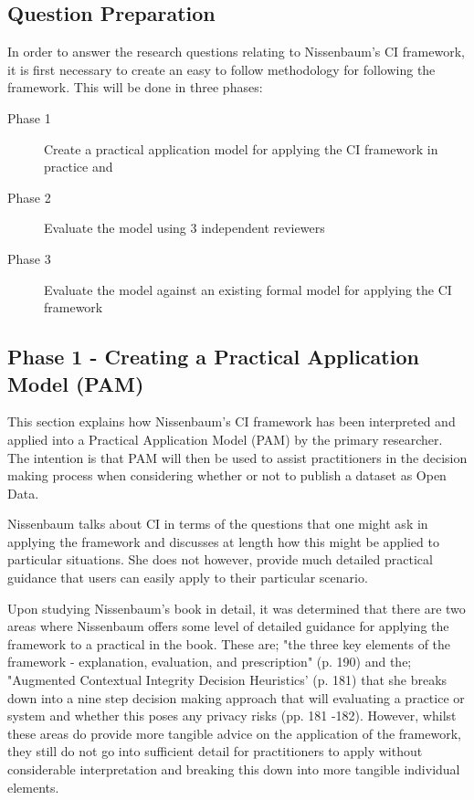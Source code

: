 \subsection {Question Preparation}

In order to answer the research questions relating to Nissenbaum's CI framework, it is first necessary to create an easy to follow methodology for following the framework. This will be done in three phases:  %

\begin{description}

\item [Phase 1] Create a practical application model for applying the CI framework in practice and
\item [Phase 2] Evaluate the model using 3 independent reviewers
\item [Phase 3] Evaluate the model against an existing formal model for applying the CI framework
\end{description}

\subsection{Phase 1 - Creating a Practical Application Model (PAM)} 

This section explains how Nissenbaum's CI framework has been interpreted and applied into a Practical Application Model (PAM) by the primary researcher. %
The intention is that PAM will then be used to assist practitioners in the decision making process when considering whether or not to publish a dataset as Open Data.

Nissenbaum talks about CI in terms of the questions that one might ask in applying the framework and discusses at length how this might be applied to particular situations. She does not however, provide much detailed practical guidance that users can easily apply to their particular scenario.

Upon studying Nissenbaum's book in detail, %
it was determined that there are two areas where Nissenbaum offers some level of detailed guidance for applying the framework to a practical in the book. These are; %
"the three key elements of the framework - explanation, evaluation, and prescription" (p. 190) and the; "Augmented Contextual Integrity Decision Heuristics' (p. 181) that she breaks down into a nine step decision making approach that will evaluating a practice or system and whether this poses any privacy risks (pp. 181 -182). However, whilst these areas do provide more tangible advice on the application of the framework, they still do not go into sufficient detail for practitioners to apply without considerable interpretation and breaking this down into more tangible individual elements. 

